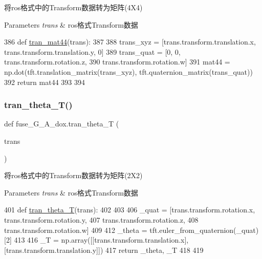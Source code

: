 将ros格式中的\+Transform数据转为矩阵(4\+X4) 


\begin{DoxyParams}{Parameters}
{\em trans} & ros格式\+Transform数据 \\
\hline
\end{DoxyParams}

\begin{DoxyCode}
386 \textcolor{keyword}{def }\hyperlink{namespacefuse___g___a__dox_afffb200826c683d789ba1613b24f12ff}{tran\_mat44}(trans):
387 
388     trans\_xyz = [trans.transform.translation.x, trans.transform.translation.y, 0]
389     trans\_quat = [0, 0, trans.transform.rotation.z,
390                   trans.transform.rotation.w]
391     mat44 = np.dot(tft.translation\_matrix(trans\_xyz), tft.quaternion\_matrix(trans\_quat))
392     \textcolor{keywordflow}{return} mat44
393 
394 
\end{DoxyCode}
\mbox{\label{namespacefuse___g___a__dox_a223efed7f7635370a23a69ae03068b56}} 
\subsubsection{\texorpdfstring{tran\+\_\+theta\+\_\+\+T()}{tran\_theta\_T()}}
{\footnotesize\ttfamily def fuse\+\_\+\+G\+\_\+\+A\+\_\+dox.\+tran\+\_\+theta\+\_\+T (\begin{DoxyParamCaption}\item[{}]{trans }\end{DoxyParamCaption})}



将ros格式中的\+Transform数据转为矩阵(2\+X2) 


\begin{DoxyParams}{Parameters}
{\em trans} & ros格式\+Transform数据 \\
\hline
\end{DoxyParams}

\begin{DoxyCode}
401 \textcolor{keyword}{def }\hyperlink{namespacefuse___g___a__dox_a223efed7f7635370a23a69ae03068b56}{tran\_theta\_T}(trans):
402 
403     
406     \_quat = [trans.transform.rotation.x, trans.transform.rotation.y,
407              trans.transform.rotation.z,
408              trans.transform.rotation.w]
409     
412     \_theta = tft.euler\_from\_quaternion(\_quat)[2]
413     
416     \_T = np.array([[trans.transform.translation.x], [trans.transform.translation.y]])
417     \textcolor{keywordflow}{return} \_theta, \_T
418 
419 
\end{DoxyCode}


